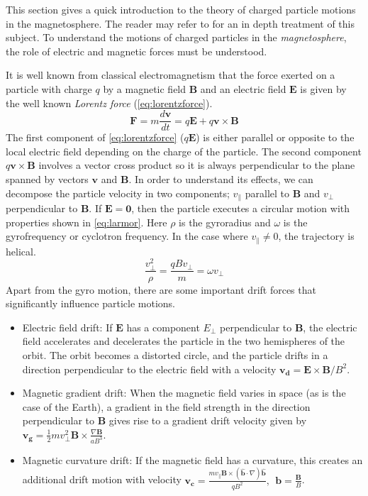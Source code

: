 This section gives a quick introduction to the theory of charged particle motions in the 
magnetosphere. The reader may refer to \citet{roederer2012dynamics} for an in depth treatment of 
this subject. To understand the motions of charged particles in the \emph{magnetosphere}, the role 
of electric and magnetic forces must be understood.

It is well known from classical electromagnetism that the force exerted on a particle with charge 
$q$ by a magnetic field $\mathbf{B}$ and an electric field $\mathbf{E}$ is given by the well known 
\emph{Lorentz force} (\cref{eq:lorentzforce}).
%
\begin{equation}\label{eq:lorentzforce}
    \mathbf{F} = m\frac{d\mathbf{v}}{dt} = q\mathbf{E} + q\mathbf{v} \times \mathbf{B}
\end{equation}
%
The first component of \cref{eq:lorentzforce} ($q\mathbf{E}$) is either parallel or opposite to the 
local electric field depending on the charge of the particle. The second component 
$q\mathbf{v} \times \mathbf{B}$ involves a vector cross product so it is always perpendicular to 
the plane spanned by vectors $\mathbf{v}$ and $\mathbf{B}$. In order to understand its effects, we 
can decompose the particle velocity in two components; $v_{\parallel}$ parallel to $\mathbf{B}$ and 
$v_{\perp}$ perpendicular to $\mathbf{B}$. If $\mathbf{E} = \mathbf{0}$, then the particle executes 
a circular motion with properties shown in \cref{eq:larmor}. Here $\rho$ is the gyroradius and 
$\omega$ is the gyrofrequency or cyclotron frequency. In the case where $v_{\parallel} \neq 0$, the 
trajectory is helical.
%
\begin{equation}\label{eq:larmor}
    \frac{v^{2}_{\perp}}{\rho} = \frac{qBv_{\perp}}{m} = \omega v_{\perp}
\end{equation}
%
Apart from the gyro motion, there are some important drift forces that significantly influence 
particle motions.
%
\begin{itemize}
    \item Electric field drift: If $\mathbf{E}$ has a component $E_{\perp}$ perpendicular to 
    $\mathbf{B}$, the electric field accelerates and decelerates the particle in the two 
    hemispheres of the orbit. The orbit becomes a distorted circle, and the particle drifts in a 
    direction perpendicular to the electric field with a velocity 
    $\mathbf{v_d} = \mathbf{E} \times \mathbf{B} / B^2$.

    \item Magnetic gradient drift: When the magnetic field varies in space (as is the case of the 
    Earth), a gradient in the field strength in the direction perpendicular to $\mathbf{B}$ gives 
    rise to a gradient drift velocity given by 
    $\mathbf{v_g} = \frac{1}{2} m v^2_{\perp}\mathbf{B} \times \frac{\nabla \mathbf{B}}{aB^3}$.

    \item Magnetic curvature drift: If the magnetic field has a curvature, this creates an 
    additional drift motion with velocity 
    $\mathbf{v_c} = \frac{ m v_{\parallel} \mathbf{B} \times (\hat{\mathbf{b}} \cdot \nabla) 
    \hat{\mathbf{b}} }{qB^2}, \ \ \mathbf{b} = \frac{\mathbf{B}}{B}$.
\end{itemize}


